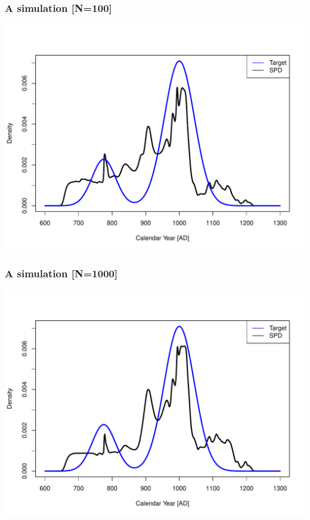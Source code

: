 \documentclass{beamer}
\begin{document}
\begin{frame}[t]
  \frametitle{A simulation [N=100]}
    \includegraphics[height=.85\textheight]{sim_target_spd_100.pdf}
\end{frame}

\begin{frame}[t]
  \frametitle{A simulation [N=1000]}
    \includegraphics[height=.85\textheight]{sim_target_spd_1000.pdf}
\end{frame}
\end{document}
